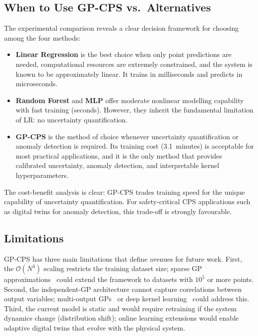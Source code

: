 \documentclass[conference]{IEEEtran}
\begin{document}
\subsection{When to Use GP-CPS vs.\ Alternatives}

The experimental comparison reveals a clear decision framework for choosing among the four methods:

\begin{itemize}
\item \textbf{Linear Regression} is the best choice when only point predictions are needed, computational resources are extremely constrained, and the system is known to be approximately linear. It trains in milliseconds and predicts in microseconds.

\item \textbf{Random Forest} and \textbf{MLP} offer moderate nonlinear modelling capability with fast training (seconds). However, they inherit the fundamental limitation of LR: no uncertainty quantification.

\item \textbf{GP-CPS} is the method of choice whenever uncertainty quantification or anomaly detection is required. Its training cost (3.1~minutes) is acceptable for most practical applications, and it is the only method that provides calibrated uncertainty, anomaly detection, and interpretable kernel hyperparameters.
\end{itemize}

The cost-benefit analysis is clear: GP-CPS trades training speed for the unique capability of uncertainty quantification. For safety-critical CPS applications such as digital twins for anomaly detection, this trade-off is strongly favourable.

\subsection{Limitations}

GP-CPS has three main limitations that define avenues for future work. First, the $\mathcal{O}(N^3)$ scaling restricts the training dataset size; sparse GP approximations~\cite{quinonero2005} could extend the framework to datasets with $10^5$ or more points. Second, the independent-GP architecture cannot capture correlations between output variables; multi-output GPs~\cite{alvarez2012} or deep kernel learning~\cite{wilson2016} could address this. Third, the current model is static and would require retraining if the system dynamics change (distribution shift); online learning extensions would enable adaptive digital twins that evolve with the physical system.
\end{document}
